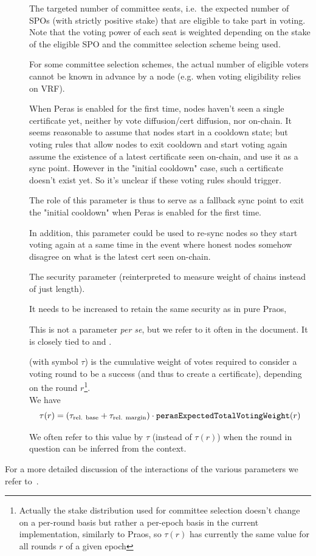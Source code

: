 \begin{description}
\item[\perasN]
  The targeted number of committee seats, i.e.\ the expected number of SPOs (with strictly positive stake) that are eligible to take part in voting. Note that the voting power of each seat is weighted depending on the stake of the eligible SPO and the committee selection scheme being used.

  For some committee selection schemes, the actual number of eligible voters cannot be known in advance by a node (e.g. when voting eligibility relies on VRF).

\item[\perasBootstrapRound]
  When Peras is enabled for the first time, nodes haven't seen a single certificate yet, neither by vote diffusion/cert diffusion, nor on-chain. It seems reasonable to assume that nodes start in a cooldown state; but voting rules that allow nodes to exit cooldown and start voting again assume the existence of a latest certificate seen on-chain, and use it as a sync point. However in the "initial cooldown" case, such a certificate doesn't exist yet. So it's unclear if these voting rules should trigger.

  The role of this parameter is thus to serve as a fallback sync point to exit the "initial cooldown" when Peras is enabled for the first time.

  In addition, this parameter could be used to re-sync nodes so they start voting again at a same time in the event where honest nodes somehow disagree on what is the latest cert seen on-chain.
\item[\kcp]
  The security parameter (reinterpreted to measure weight of chains instead of just length).

  It needs to be increased to retain the same security as in pure Praos,  
\item[\perasQuorum]
  This is not a parameter \textit{per se}, but we refer to it often in the document. It is closely tied to \perasQuorumBase{} and \perasQuorumSafetyMargin{}.

  \perasQuorum{} (with symbol $\tau$) is the cumulative weight of votes required to consider a voting round to be a success (and thus to create a certificate), depending on the round $r$\footnote{Actually the stake distribution used for committee selection doesn't change on a per-round basis but rather a per-epoch basis in the current implementation, similarly to Praos, so $\tau(r)$ has currently the same value for all rounds $r$ of a given epoch}.\\
  We have
  \[
    \tau(r) = (\tau_{\text{rel. base}} + \tau_{\text{rel. margin}}) \cdot \mathtt{perasExpectedTotalVotingWeight}(r)
  \]

  We often refer to this value by $\tau$ (instead of $\tau(r)$) when the round in question can be inferred from the context.
\end{description}

For a more detailed discussion of the interactions of the various parameters we refer to~\cite{peras-cip}.

